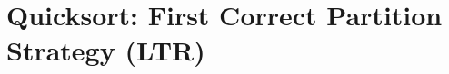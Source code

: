 \section{Quicksort: First Correct Partition Strategy (LTR)}


\begin{comment}
I want to now design a partition strategy that works {\it inplace}, i.e.,
directly on the array without creating a new array.

Basically I break up the array into three parts:
the pivot \verb!p!, 
the \verb!left! chunk, the chunk of \verb!TODO!, and the \verb!right!
chunk:
\begin{python}
s = r"""
from quicksort_init import *
p = Plot()
s = chunkedarray(cellwidth=cellwidth, 
                   cellheight=cellheight,
                   arr=[['p'], 4*[''], 7*[''], 5*['']],
                   pipeheight=pipeheight,
                   chunklabels=[('pivot',-1),'left','TODO', 'right'],
                   )
p.add(s)
print(p)
"""
from latextool_basic import makeandincludegraphics
print(makeandincludegraphics(python=s))
\end{python}

Of course those \verb!|! in bold are just to help visualize the 
division of the array into parts.
Later when we design a proper algorithm, we will need 
variables to indicate the positions of these dividers.
Let's not worry about these variables for now.

The \verb!TODO! list initially contains all the values in the array
other than the pivot.
I examine the values in \verb!TODO! (scanning left-to-right),
putting the values into the \verb!left! or \verb!right! pile.
When, the \verb!TODO! list is empty, I would have the 
\verb!left! and \verb!right!.
Of course, initially
the \verb!left! and \verb!right! piles are empty.

Going back to our example,
given the array
\begin{python}
s = r"""
from quicksort_init import *
p = Plot()
s = chunkedarray(cellwidth=cellwidth, 
                   cellheight=cellheight,
                   arr=[[2,1,6,5,3,0,4]],
                   pipeheight=pipeheight,
)
p.add(s)
print(p)
"""
from latextool_basic import makeandincludegraphics
print(makeandincludegraphics(python=s))
\end{python}


\end{comment}
